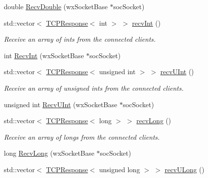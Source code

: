 \begin{DoxyCompactItemize}
double \hyperlink{class_rad_j_a_v_1_1_networking_1_1wx_widgets_t_c_p_server_a174193c32b2d90a5b25fd1d44be7e3ac}{Recv\+Double} (wx\+Socket\+Base $\ast$soc\+Socket)
\item 
std\+::vector$<$ \hyperlink{class_rad_j_a_v_1_1_networking_1_1_t_c_p_response}{T\+C\+P\+Response}$<$ int $>$ $>$ \hyperlink{class_rad_j_a_v_1_1_networking_1_1wx_widgets_t_c_p_server_a141060e567ebda7607cf74fe086a8e4c}{recv\+Int} ()
\begin{DoxyCompactList}\small\item\em Receive an array of ints from the connected clients. \end{DoxyCompactList}\item 
int \hyperlink{class_rad_j_a_v_1_1_networking_1_1wx_widgets_t_c_p_server_a6b95b5c066ae471279a2d47cee0a08c9}{Recv\+Int} (wx\+Socket\+Base $\ast$soc\+Socket)
\item 
std\+::vector$<$ \hyperlink{class_rad_j_a_v_1_1_networking_1_1_t_c_p_response}{T\+C\+P\+Response}$<$ unsigned int $>$ $>$ \hyperlink{class_rad_j_a_v_1_1_networking_1_1wx_widgets_t_c_p_server_aefa435e65eef2200e74f1fd903447071}{recv\+U\+Int} ()
\begin{DoxyCompactList}\small\item\em Receive an array of unsigned ints from the connected clients. \end{DoxyCompactList}\item 
unsigned int \hyperlink{class_rad_j_a_v_1_1_networking_1_1wx_widgets_t_c_p_server_abadf9ba29321eee138d88bf2b1390ded}{Recv\+U\+Int} (wx\+Socket\+Base $\ast$soc\+Socket)
\item 
std\+::vector$<$ \hyperlink{class_rad_j_a_v_1_1_networking_1_1_t_c_p_response}{T\+C\+P\+Response}$<$ long $>$ $>$ \hyperlink{class_rad_j_a_v_1_1_networking_1_1wx_widgets_t_c_p_server_aa52be52a0a3aaec2402f838ce39d734d}{recv\+Long} ()
\begin{DoxyCompactList}\small\item\em Receive an array of longs from the connected clients. \end{DoxyCompactList}\item 
long \hyperlink{class_rad_j_a_v_1_1_networking_1_1wx_widgets_t_c_p_server_a1d173552c639864d6e1a27f57b59ff9b}{Recv\+Long} (wx\+Socket\+Base $\ast$soc\+Socket)
\item 
std\+::vector$<$ \hyperlink{class_rad_j_a_v_1_1_networking_1_1_t_c_p_response}{T\+C\+P\+Response}$<$ unsigned long $>$ $>$ \hyperlink{class_rad_j_a_v_1_1_networking_1_1wx_widgets_t_c_p_server_a9330de8d1fe3d184006cbcfb3c88e87f}{recv\+U\+Long} ()

\end{DoxyCompactItemize}
